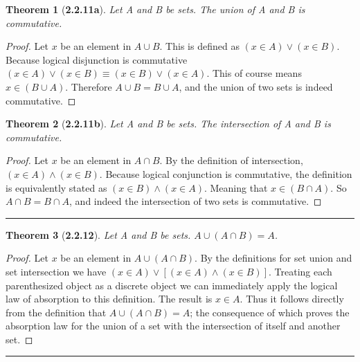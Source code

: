 \documentclass[a4paper, 12pt]{article}
\theoremstyle{plain}
\newtheorem*{theorem*}{Theorem}
\begin{document}
\begin{theorem*}[\textbf{2.2.11a}]
    Let A and B be sets. The union of A and B is commutative.
\end{theorem*}

\begin{proof}
    Let $x$ be an element in $A \cup B$. This is defined as $(x \in A) \lor (x \in B)$. Because logical 
    disjunction is commutative \newline $(x \in A) \lor (x \in B) \equiv (x \in B) \lor (x \in A)$. This 
    of course means $x \in (B \cup A)$. Therefore $A \cup B = B \cup A$, and the union of two sets is 
    indeed commutative.
\end{proof}

\pagebreak


\begin{theorem*}[\textbf{2.2.11b}]
    Let A and B be sets. The intersection of A and B is commutative.
\end{theorem*}

\begin{proof}
    Let $x$ be an element in $A \cap B$. By the definition of intersection, $(x \in A) \land (x \in B)$. 
    Because logical conjunction is commutative, the definition is equivalently stated as 
    $(x \in B) \land (x \in A)$. Meaning that $x \in (B \cap A)$. So $A \cap B = B \cap A$, and indeed 
    the intersection of two sets is commutative.
\end{proof}
\begin{center}
    \rule{5.4in}{1pt}
\end{center}


\begin{theorem*}[\textbf{2.2.12}]
    Let A and B be sets. $A \cup (A \cap B) = A$.
\end{theorem*}

\begin{proof}
    Let $x$ be an element in $A \cup (A \cap B)$. By the definitions for set union and set intersection 
    we have $(x \in A) \lor [(x \in A) \land (x \in B)]$. Treating each parenthesized object as a 
    discrete object we can immediately apply the logical law of absorption to this definition. The result 
    is $x \in A$. Thus it follows directly from the definition that $A \cup (A \cap B) = A$; the consequence 
    of which proves the absorption law for the union of a set with the intersection of itself and another set.
\end{proof}
\begin{center}
    \rule{5.4in}{1pt}
\end{center}
\end{document}
